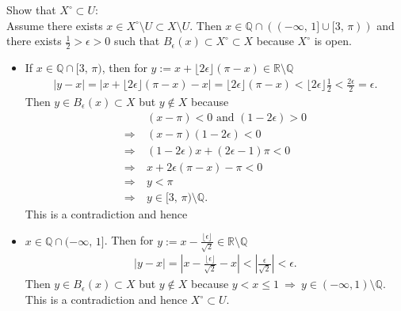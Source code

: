 \documentclass{article}
\begin{document}
Show that $X^{\circ} \subset U$: \\
Assume there exists $x \in X^{\circ} \setminus U \subset X \setminus U$.
Then $x \in \mathbb{Q} \cap ((-\infty,\, 1] \cup [3 ,\, \pi))$ and there exists $ \frac{1}{2} > \epsilon > 0 $ such that $B_{\epsilon}(x) \subset X^{\circ} \subset X$ because $X^{\circ}$ is open.

\begin{itemize}
\item If $x \in \mathbb{Q} \cap [3 ,\, \pi)$, then for $y := x + \lfloor 2 \epsilon \rfloor (\pi - x) \in \mathbb{R} \setminus \mathbb{Q}$
  \begin{align*}
    |y - x| = |x + \lfloor 2 \epsilon \rfloor (\pi - x) - x| = \lfloor 2 \epsilon \rfloor (\pi - x) < \lfloor 2 \epsilon \rfloor \frac{1}{2} < \frac{2 \epsilon}{2} = \epsilon.
  \end{align*}
  Then $y \in B_{\epsilon}(x) \subset X$ but $y \notin X$ because
  \begin{align*}
    & (x-\pi) < 0 \text{ and } (1 - 2 \epsilon) > 0 \\
    \Rightarrow \ & (x - \pi)( 1 - 2\epsilon) < 0 \\
    \Rightarrow \ & (1- 2\epsilon) x + (2\epsilon - 1) \pi < 0 \\
    \Rightarrow \ & x + 2\epsilon (\pi - x) - \pi < 0 \\
    \Rightarrow \ & y < \pi \\
    \Rightarrow \ & y \in [3,\, \pi) \setminus \mathbb{Q}.
  \end{align*}
  This is a contradiction and hence
\item $x \in \mathbb{Q} \cap (-\infty ,\, 1]$. Then for $y := x - \frac{\lfloor \epsilon \rfloor}{\sqrt{2}} \in \mathbb{R} \setminus \mathbb{Q}$
  \begin{align*}
    |y - x| = \left| x - \frac{\lfloor \epsilon \rfloor}{\sqrt 2} - x \right| < \left| \frac{\epsilon}{\sqrt 2} \right| < \epsilon.
  \end{align*}
  Then $y \in B_{\epsilon}(x) \subset X$ but $y \notin X$ because $y < x \leq 1 \ \Rightarrow \ y \in (-\infty, 1) \setminus \mathbb{Q}$.
  This is a contradiction and hence $X^{\circ} \subset U$.
\end{itemize}
\end{document}
